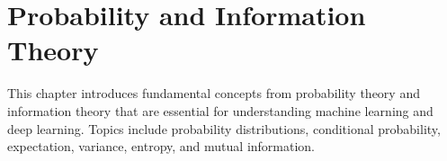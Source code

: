 
\chapter{Probability and Information Theory}
\label{chap:probability}

This chapter introduces fundamental concepts from probability theory and information theory that are essential for understanding machine learning and deep learning. Topics include probability distributions, conditional probability, expectation, variance, entropy, and mutual information.






